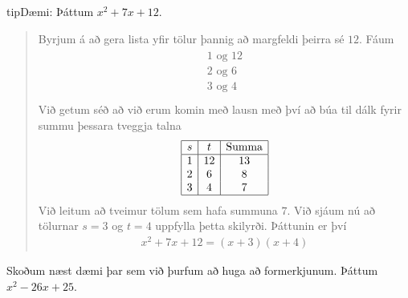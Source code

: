 \documentclass[a4paper,10pt,icelandic]{sphinxmanual}
\begin{document}
\begin{sphinxadmonition}{tip}{Dæmi:}
 Þáttum \(x^2+7x+12\).
\begin{quote}

Byrjum á að gera lista yfir tölur þannig að margfeldi þeirra sé \(12\). Fáum
\begin{equation*}
\begin{split}\begin{array}{c}
1 \text{ og } 12 \\
2 \text{ og } 6 \\
3 \text{ og } 4 \\
\end{array}\end{split}
\end{equation*}
Við getum séð að við erum komin með lausn með því að búa til dálk fyrir summu þessara tveggja talna
\begin{equation*}
\begin{split}\begin{array}{ | c | c | c | }
\hline
s & t & \text{Summa} \\
\hline
1 & 12 & 13\\
2 & 6 & 8\\
3 & 4  & 7 \\
\hline
\end{array}\end{split}
\end{equation*}
Við leitum að tveimur tölum sem hafa summuna \(7\). Við sjáum nú að tölurnar \(s = 3\) og \(t = 4\) uppfylla þetta skilyrði. Þáttunin er því
\begin{equation*}
\begin{split}x^2+7x+12=(x+3)(x+4)\end{split}
\end{equation*}\end{quote}

 Skoðum næst dæmi þar sem við þurfum að huga að formerkjunum. Þáttum \(x^2-26x+25\).
\begin{quote}


\end{quote}
\end{sphinxadmonition}
\end{document}
